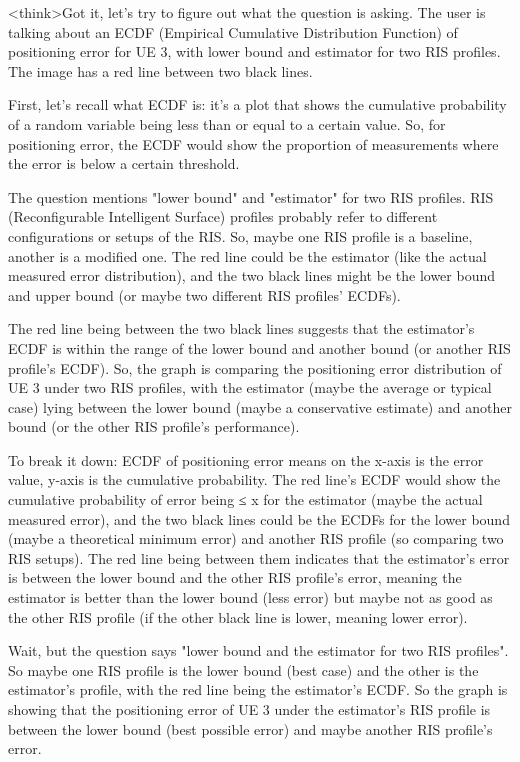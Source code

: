 <think>Got it, let's try to figure out what the question is asking. The user is talking about an ECDF (Empirical Cumulative Distribution Function) of positioning error for UE 3, with lower bound and estimator for two RIS profiles. The image has a red line between two black lines. 

First, let's recall what ECDF is: it's a plot that shows the cumulative probability of a random variable being less than or equal to a certain value. So, for positioning error, the ECDF would show the proportion of measurements where the error is below a certain threshold. 

The question mentions "lower bound" and "estimator" for two RIS profiles. RIS (Reconfigurable Intelligent Surface) profiles probably refer to different configurations or setups of the RIS. So, maybe one RIS profile is a baseline, another is a modified one. The red line could be the estimator (like the actual measured error distribution), and the two black lines might be the lower bound and upper bound (or maybe two different RIS profiles' ECDFs). 

The red line being between the two black lines suggests that the estimator's ECDF is within the range of the lower bound and another bound (or another RIS profile's ECDF). So, the graph is comparing the positioning error distribution of UE 3 under two RIS profiles, with the estimator (maybe the average or typical case) lying between the lower bound (maybe a conservative estimate) and another bound (or the other RIS profile's performance). 

To break it down: ECDF of positioning error means on the x-axis is the error value, y-axis is the cumulative probability. The red line's ECDF would show the cumulative probability of error being ≤ x for the estimator (maybe the actual measured error), and the two black lines could be the ECDFs for the lower bound (maybe a theoretical minimum error) and another RIS profile (so comparing two RIS setups). The red line being between them indicates that the estimator's error is between the lower bound and the other RIS profile's error, meaning the estimator is better than the lower bound (less error) but maybe not as good as the other RIS profile (if the other black line is lower, meaning lower error). 

Wait, but the question says "lower bound and the estimator for two RIS profiles". So maybe one RIS profile is the lower bound (best case) and the other is the estimator's profile, with the red line being the estimator's ECDF. So the graph is showing that the positioning error of UE 3 under the estimator's RIS profile is between the lower bound (best possible error) and maybe another RIS profile's error. 

